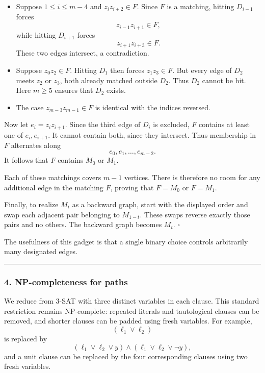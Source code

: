 \documentclass[
  11pt,
  a4paper,
]{article}
\begin{document}
\begin{itemize}
\item
  Suppose \(1\le i\le m-4\) and \(z_i z_{i+2}\in F\). Since \(F\) is a
  matching, hitting \(D_{i-1}\) forces \[
  z_{i-1}z_{i+1}\in F,
  \] while hitting \(D_{i+1}\) forces \[
  z_{i+1}z_{i+3}\in F.
  \] These two edges intersect, a contradiction.
\item
  Suppose \(z_0z_2\in F\). Hitting \(D_1\) then forces \(z_1z_3\in F\).
  But every edge of \(D_2\) meets \(z_2\) or \(z_3\), both already
  matched outside \(D_2\). Thus \(D_2\) cannot be hit. Here \(m\ge5\)
  ensures that \(D_2\) exists.
\item
  The case \(z_{m-3}z_{m-1}\in F\) is identical with the indices
  reversed.
\end{itemize}

Now let \(e_i=z_i z_{i+1}\). Since the third edge of \(D_i\) is
excluded, \(F\) contains at least one of \(e_i,e_{i+1}\). It cannot
contain both, since they intersect. Thus membership in \(F\) alternates
along \[
e_0,e_1,\ldots,e_{m-2}.
\] It follows that \(F\) contains \(M_0\) or \(M_1\).

Each of these matchings covers \(m-1\) vertices. There is therefore no
room for any additional edge in the matching \(F\), proving that
\(F=M_0\) or \(F=M_1\).

Finally, to realize \(M_t\) as a backward graph, start with the
displayed order and swap each adjacent pair belonging to \(M_{1-t}\).
These swaps reverse exactly those pairs and no others. The backward
graph becomes \(M_t\). \(\square\)

The usefulness of this gadget is that a single binary choice controls
arbitrarily many designated edges.

\begin{center}\rule{0.5\linewidth}{0.5pt}\end{center}

\subsubsection{4. NP-completeness for
paths}\label{np-completeness-for-paths}

We reduce from 3-SAT with three distinct variables in each clause. This
standard restriction remains NP-complete: repeated literals and
tautological clauses can be removed, and shorter clauses can be padded
using fresh variables. For example, \[
(\ell_1\vee\ell_2)
\] is replaced by \[
(\ell_1\vee\ell_2\vee y)\wedge
(\ell_1\vee\ell_2\vee\neg y),
\] and a unit clause can be replaced by the four corresponding clauses
using two fresh variables.
\end{document}
